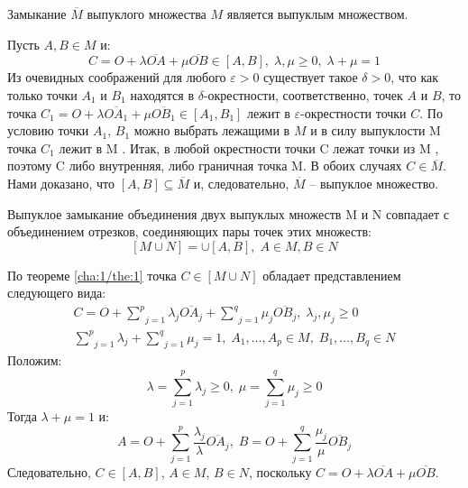 \begin{propose}[]\label{cha:1/clair:2}
	Замыкание $\overline{M}$ выпуклого множества $M$ является выпуклым множеством.
\end{propose}
\begin{Proof}
	Пусть $A, B \in M$ и:
	$$C = O + \lambda \overline{OA} + \mu \overline{OB} \in [A, B], \; \lambda, \mu \ge 0, \; \lambda + \mu = 1$$
	Из очевидных соображений для любого $\varepsilon > 0$ существует такое $\delta > 0$, что как только точки $A_1$ и $B_1$ находятся в $\delta$-окрестности, соответственно, точек $A$ и $B$, то точка $\displaystyle C_1 = O + \lambda \overline{OA_1} + \mu \overline{OB_1} \in [A_1, B_1]$ лежит в $\varepsilon$-окрестности точки $C$. По условию точки $A_1$, $B_1$ можно выбрать лежащими в $M$ и в силу выпуклости M точка $C_1$ лежит в M . Итак, в любой окрестности точки C лежат точки из M , поэтому C либо внутренняя, либо граничная точка M. В обоих случаях $C \in \overline{M}$. Нами доказано, что $[A,B] \subseteq \overline{M}$ и, следовательно, $\overline{M}$ – выпуклое множество.

\end{Proof}

\begin{lemma}\label{cha:1/lemma:1}
	Выпуклое замыкание объединения двух выпуклых множеств M и N совпадает с объединением отрезков, соединяющих пары точек этих множеств:
	$$[M \cup N] = \cup [A, B], \; A \in M, B \in N$$
\end{lemma}
\begin{Proof}
	По теореме \ref{cha:1/the:1} точка $C \in [M \cup N ]$ обладает представлением следующего вида:
	$$\begin{gathered}
		C = O + \underset{j=1}{\overset{p}{\sum}}\lambda_j \overline{OA_j} + \underset{j=1}{\overset{q}{\sum}}\mu_j \overline{O B_j}, \; \lambda_j, \mu_j \ge 0 \\
		\underset{j=1}{\overset{p}{\sum}}\lambda_j + \underset{j=1}{\overset{q}{\sum}}\mu_j = 1, \; A_1, \dots, A_p \in M, \; B_1, \dots, B_q \in N
	\end{gathered}$$
	Положим:
	$$\lambda = \underset{j=1}{\overset{p}{\sum}}\lambda_j \ge 0, \; \mu = \underset{j=1}{\overset{q}{\sum}}\mu_j \ge 0$$
	Тогда $\lambda + \mu = 1$ и:
	$$A = O + \underset{j=1}{\overset{p}{\sum}}\frac{\lambda_j}{\lambda} \overline{OA_j}, \; B = O + \underset{j=1}{\overset{q}{\sum}}\frac{\mu_j}{\mu} \overline{OB_j}$$
	Следовательно, $C \in [A, B]$, $A \in M$, $B \in N$, поскольку $\displaystyle C = O + \lambda \overline{OA} + \mu \overline{OB}$.
\end{Proof}


